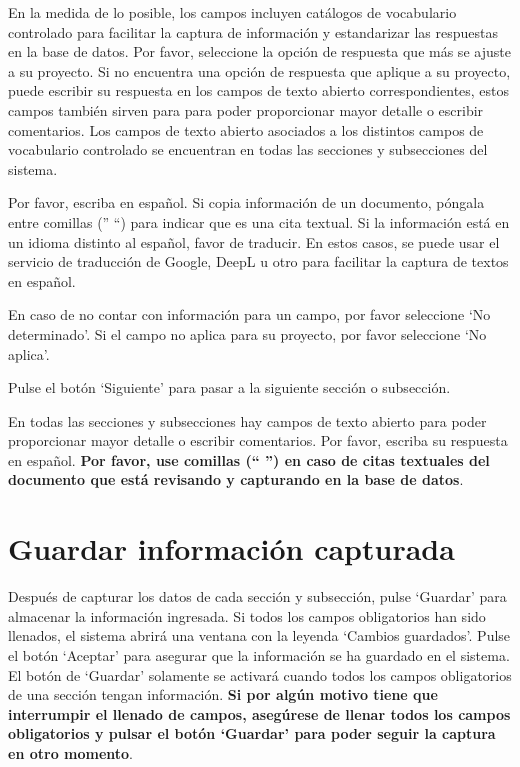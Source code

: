 \documentclass[
]{book}
\begin{document}
En la medida de lo posible, los campos incluyen catálogos de vocabulario controlado para facilitar la captura de información y estandarizar las respuestas en la base de datos. Por favor, seleccione la opción de respuesta que más se ajuste a su proyecto.
Si no encuentra una opción de respuesta que aplique a su proyecto, puede escribir su respuesta en los campos de texto abierto correspondientes, estos campos también sirven para para poder proporcionar mayor detalle o escribir comentarios. Los campos de texto abierto asociados a los distintos campos de vocabulario controlado se encuentran en todas las secciones y subsecciones del sistema.

Por favor, escriba en español. Si copia información de un documento, póngala entre comillas ('' ``) para indicar que es una cita textual. Si la información está en un idioma distinto al español, favor de traducir. En estos casos, se puede usar el servicio de traducción de Google, DeepL u otro para facilitar la captura de textos en español.

En caso de no contar con información para un campo, por favor seleccione `No determinado'. Si el campo no aplica para su proyecto, por favor seleccione `No aplica'.

Pulse el botón `Siguiente' para pasar a la siguiente sección o subsección.

En todas las secciones y subsecciones hay campos de texto abierto para poder proporcionar mayor detalle o escribir comentarios. Por favor, escriba su respuesta en español. \textbf{Por favor, use comillas (`` '') en caso de citas textuales del documento que está revisando y capturando en la base de datos}.

\hypertarget{guardar-informaciuxf3n-capturada}{%
\section{Guardar información capturada}\label{guardar-informaciuxf3n-capturada}}

Después de capturar los datos de cada sección y subsección, pulse `Guardar' para almacenar la información ingresada. Si todos los campos obligatorios han sido llenados, el sistema abrirá una ventana con la leyenda `Cambios guardados'. Pulse el botón `Aceptar' para asegurar que la información se ha guardado en el sistema. El botón de `Guardar' solamente se activará cuando todos los campos obligatorios de una sección tengan información. \textbf{Si por algún motivo tiene que interrumpir el llenado de campos, asegúrese de llenar todos los campos obligatorios y pulsar el botón `Guardar' para poder seguir la captura en otro momento}.
\end{document}
